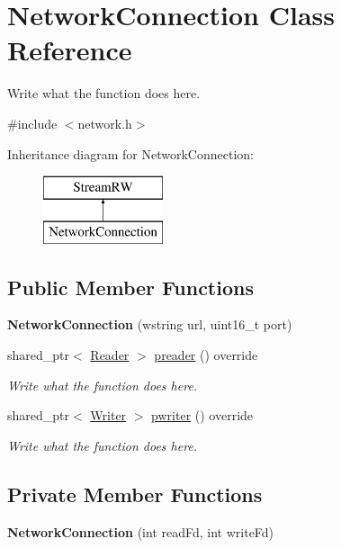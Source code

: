 \hypertarget{classNetworkConnection}{\section{Network\+Connection Class Reference}
\label{classNetworkConnection}
}


Write what the function does here.  




{\ttfamily \#include $<$network.\+h$>$}

Inheritance diagram for Network\+Connection\+:\begin{figure}[H]
\begin{center}
\leavevmode
\includegraphics[height=2.000000cm]{classNetworkConnection}
\end{center}
\end{figure}
\subsection*{Public Member Functions}
\begin{DoxyCompactItemize}
\item 
\hypertarget{classNetworkConnection_a78733e203c2aef9a0cb1538476c637d7}{{\bfseries Network\+Connection} (wstring url, uint16\+\_\+t port)}\label{classNetworkConnection_a78733e203c2aef9a0cb1538476c637d7}

\item 
shared\+\_\+ptr$<$ \hyperlink{classReader}{Reader} $>$ \hyperlink{classNetworkConnection_a3cd959362a6b007ad005f330463c2216}{preader} () override
\begin{DoxyCompactList}\small\item\em Write what the function does here. \end{DoxyCompactList}\item 
shared\+\_\+ptr$<$ \hyperlink{classWriter}{Writer} $>$ \hyperlink{classNetworkConnection_a2cc73fa5d5c9b4cf74579946dc136b5a}{pwriter} () override
\begin{DoxyCompactList}\small\item\em Write what the function does here. \end{DoxyCompactList}\end{DoxyCompactItemize}
\subsection*{Private Member Functions}
\begin{DoxyCompactItemize}
\item 
\hypertarget{classNetworkConnection_a9a07574433d99140bae5f156c1985394}{{\bfseries Network\+Connection} (int read\+Fd, int write\+Fd)}\label{classNetworkConnection_a9a07574433d99140bae5f156c1985394}

\end{DoxyCompactItemize}
